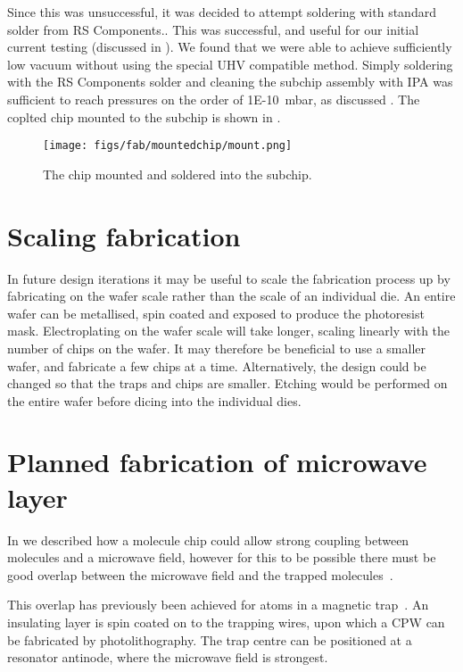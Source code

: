 Since this was unsuccessful, it was decided to attempt soldering with standard
solder from RS Components.. This was successful, and useful for our initial current
testing (discussed in ). We found that we were able to
achieve sufficiently low vacuum without using the special UHV compatible
method. Simply soldering with the RS Components solder and cleaning the subchip
assembly with IPA was sufficient to reach pressures on the order of
\SI{1E-10}{\milli\bar}, as discussed . The coplted chip
mounted to the subchip is shown in .

\begin{figure}
  \centering
  \texttt{[image: figs/fab/mountedchip/mount.png]}
  \caption{The chip mounted and soldered into the subchip.}
  \label{fab:fig:mountedchip}
\end{figure}

\section{Scaling fabrication}

In future design iterations it may be useful to scale the fabrication process
up by fabricating on the wafer scale rather than the scale of an individual
die. An entire wafer can be metallised, spin coated and exposed to
produce the photoresist mask. Electroplating on the wafer scale will take
longer, scaling linearly with the number of chips on the wafer. It may therefore
be beneficial to use a smaller wafer, and fabricate a few chips at a time.
Alternatively, the design could be changed so that the traps and chips are
smaller. Etching would be performed on the entire wafer before dicing into the
individual dies.

\section{Planned fabrication of microwave layer}
\label{fab:planned}

In 
we described how a molecule chip could allow strong coupling between \CaF{}
molecules and a microwave field, however for this to be possible there must be
good overlap between the microwave field and the trapped
molecules~\cite{Andre2006}.

This overlap has previously been achieved for atoms in a magnetic
trap~\cite{Treutlein2008}. An insulating layer is spin coated on to the
trapping wires, upon which a CPW can be fabricated by photolithography. The
trap centre can be positioned at a resonator antinode, where the microwave
field is strongest.

